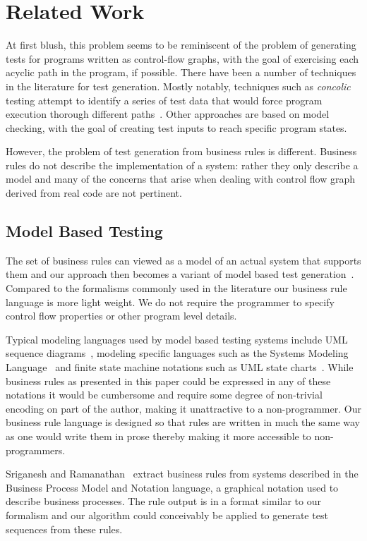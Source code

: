 \section{Related Work}

At first blush, this problem seems to be reminiscent of the problem of
generating tests for programs written as control-flow graphs, with the
goal of exercising each acyclic path in the program, if possible.
There have been a number of techniques in the literature for test
generation. Mostly notably, techniques such as \textit{concolic}
testing attempt to identify a series of test data that would force
program execution thorough different paths~\cite{dart, concolic}.  Other
approaches are based on model checking, with the goal of creating test
inputs to reach specific program states.

However, the problem of test generation from business rules is
different. Business rules do not describe the implementation of a
system: rather they only describe a model and many of the concerns
that arise when dealing with control flow graph derived from real code
are not pertinent.

\subsection{Model Based Testing}

The set of business rules can viewed as a model of an actual system
that supports them and our approach then becomes a variant of model
based test generation~\cite{utting2012}. Compared to the formalisms commonly used in the
literature our business rule language is more light weight. We do not
require the programmer to specify control flow properties or other
program level details.

Typical modeling languages used by model based testing systems include
UML sequence diagrams~\cite{nayak2009}, modeling specific languages
such as the Systems Modeling Language~\cite{friedenthal2011} and
finite state machine notations such as UML
state charts~\cite{offhut99}. While business rules as presented in this
paper could be expressed in any of these notations it would be
cumbersome and require some degree of non-trivial encoding on part of
the author, making it unattractive to a non-programmer. Our business
rule language is designed so that rules are written in much the same
way as one would write them in prose thereby making it more accessible
to non-programmers.

Sriganesh and Ramanathan~\cite{sriganesh2012} extract business rules
from systems described in the Business Process Model and Notation
language, a graphical notation used to describe business
processes. The rule output is in a format similar to our formalism and
our algorithm could conceivably be applied to generate test sequences
from these rules.


